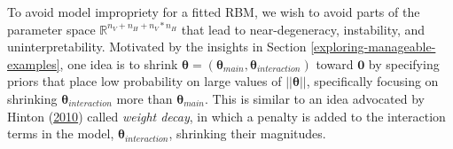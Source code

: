 \documentclass[]{article}
\theoremstyle{definition}
\newcommand{\nv}{{n_{\scriptscriptstyle V}}}
\newcommand{\nh}{{n_{\scriptscriptstyle H}}}
\begin{document}
To avoid model impropriety for a fitted RBM, we wish to avoid parts of
the parameter space \(\mathbb{R}^{\nv + \nh + \nv*\nh}\) that lead to
near-degeneracy, instability, and uninterpretability. Motivated by the
insights in Section \ref{exploring-manageable-examples}, one idea is to
shrink
\(\boldsymbol \theta = (\boldsymbol \theta_{main}, \boldsymbol \theta_{interaction})\)
toward \(\boldsymbol 0\) by specifying priors that place low probability
on large values of \(||\boldsymbol \theta||\), specifically focusing on
shrinking \(\boldsymbol \theta_{interaction}\) more than
\(\boldsymbol \theta_{main}\). This is similar to an idea advocated by
Hinton (\protect\hyperlink{ref-hinton2010practical}{2010}) called
\emph{weight decay}, in which a penalty is added to the interaction
terms in the model, \(\boldsymbol \theta_{interaction}\), shrinking
their magnitudes.
\end{document}
